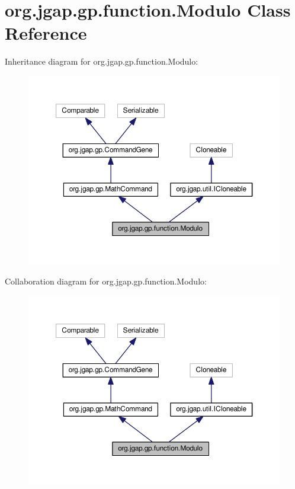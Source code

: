\hypertarget{classorg_1_1jgap_1_1gp_1_1function_1_1_modulo}{\section{org.\-jgap.\-gp.\-function.\-Modulo Class Reference}
\label{classorg_1_1jgap_1_1gp_1_1function_1_1_modulo}
}


Inheritance diagram for org.\-jgap.\-gp.\-function.\-Modulo\-:
\nopagebreak
\begin{figure}[H]
\begin{center}
\leavevmode
\includegraphics[width=350pt]{classorg_1_1jgap_1_1gp_1_1function_1_1_modulo__inherit__graph}
\end{center}
\end{figure}


Collaboration diagram for org.\-jgap.\-gp.\-function.\-Modulo\-:
\nopagebreak
\begin{figure}[H]
\begin{center}
\leavevmode
\includegraphics[width=350pt]{classorg_1_1jgap_1_1gp_1_1function_1_1_modulo__coll__graph}
\end{center}
\end{figure}
